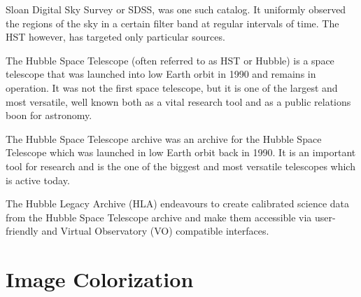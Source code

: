\documentclass[12pt, letterpaper]{article}
\begin{document}
Sloan Digital Sky Survey or SDSS, was one such catalog. It uniformly observed the regions of the sky in a certain filter band at regular intervals of time. The HST however, has targeted only particular sources.

The Hubble Space Telescope (often referred to as HST or Hubble) is a space telescope that was launched into low Earth orbit in 1990 and remains in operation. It was not the first space telescope, but it is one of the largest and most versatile, well known both as a vital research tool and as a public relations boon for astronomy.

The Hubble Space Telescope archive was an archive for the Hubble Space Telescope which was launched in low Earth orbit back in 1990. It is an important tool for research and is the one of the biggest and most versatile telescopes which is active today.


The Hubble Legacy Archive (HLA) endeavours to create calibrated science data from the Hubble Space Telescope archive and make them accessible via user-friendly and Virtual Observatory (VO) compatible interfaces.

	\section{Image Colorization}
\end{document}
